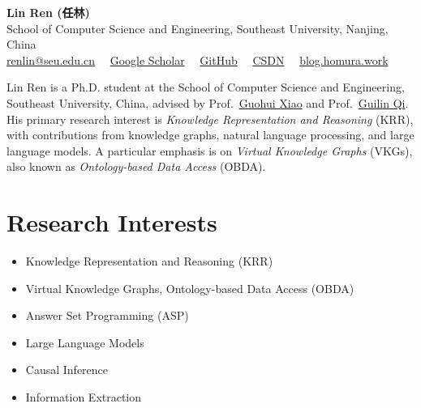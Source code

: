 \documentclass[11pt,a4paper]{article}
\begin{document}
\pagestyle{empty}

\begin{center}
  {\LARGE\bfseries Lin Ren (任林)}\\[0.55em]
  School of Computer Science and Engineering, Southeast University, Nanjing, China\\[0.35em]
  \href{mailto:renlin@seu.edu.cn}{renlin@seu.edu.cn}
  \ \textcolor{rulecolor}{\textbar}\
  \href{https://scholar.google.com/citations?user=FZ_bjkQAAAAJ&hl=en}{Google Scholar}
  \ \textcolor{rulecolor}{\textbar}\
  \href{https://github.com/HomuraT}{GitHub}
  \ \textcolor{rulecolor}{\textbar}\
  \href{https://blog.csdn.net/qq_42464569}{CSDN}
  \ \textcolor{rulecolor}{\textbar}\
  \href{https://blog.homura.work/intro/}{blog.homura.work}
\end{center}

\vspace{0.9em}

\noindent
Lin Ren is a Ph.D. student at the School of Computer Science and Engineering,
Southeast University, China, advised by
Prof.~\href{https://scholar.google.com/citations?user=hbek3dcAAAAJ}{Guohui Xiao} and
Prof.~\href{https://scholar.google.com/citations?user=1gw3LJQAAAAJ}{Guilin Qi}.
His primary research interest is \textit{Knowledge Representation and Reasoning} (KRR),
with contributions from knowledge graphs, natural language processing, and large
language models. A particular emphasis is on \textit{Virtual Knowledge Graphs} (VKGs),
also known as \textit{Ontology-based Data Access} (OBDA).

\section{Research Interests}

\begin{itemize}[leftmargin=1.3em,itemsep=0.15em,topsep=0.2em,parsep=0pt]
  \item Knowledge Representation and Reasoning (KRR)
  \item Virtual Knowledge Graphs, Ontology-based Data Access (OBDA)
  \item Answer Set Programming (ASP)
  \item Large Language Models
  \item Causal Inference
  \item Information Extraction
\end{itemize}
\end{document}
